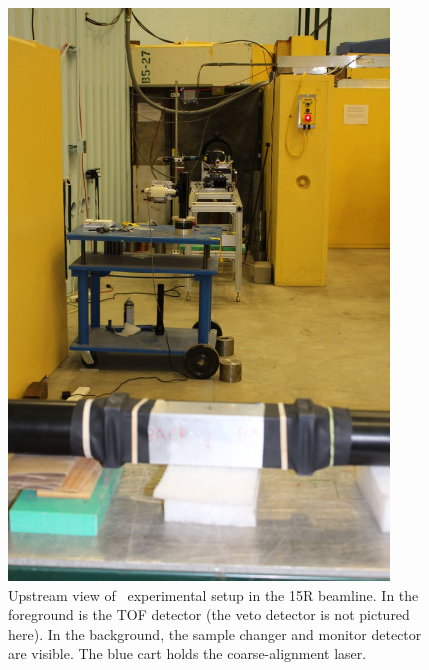 \begin{figure}[tb]
    \centering
    \includegraphics[width=0.9\textwidth]{figures/UpstreamFromTOFDetector.jpg}
    \caption[Overview of \tot\ experimental setup in the 15R beamline]
    {Upstream view of \tot\ experimental setup in the 15R beamline. In the foreground is the
        TOF detector (the veto detector is not pictured here). In the background, the sample
    changer and monitor detector are visible. The blue cart holds the coarse-alignment laser.}
    \label{BeamlineUpstream}
\end{figure}

